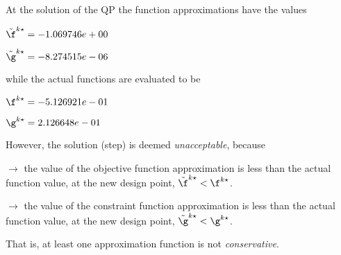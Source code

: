 At the solution of the QP the function approximations have the values

$\tilde \f^{k\star} = -1.069746e+00$

$\tilde \g^{k\star} = -8.274515e-06$

\bigskip
while the actual functions are evaluated to be

$\f^{k\star} = -5.126921e-01$

$\g^{k\star} =  2.126648e-01$

\bigskip
 However, the solution (step)                     is deemed \emph{unacceptable}, because 
 
$\to$ the value of the objective                         function approximation is less than the actual function                         value, at the new design point,                         $\tilde {\f}^{k\star} < {\f}^{k\star}$.

 $\to$ the value of the constraint function                         approximation is less than the actual function value, at                         the new design point, $\tilde {\g}^{k\star} < {\g}^{k\star}$.

 \bigskip 

 That is, at least one approximation                     function is not \emph{conservative}.
